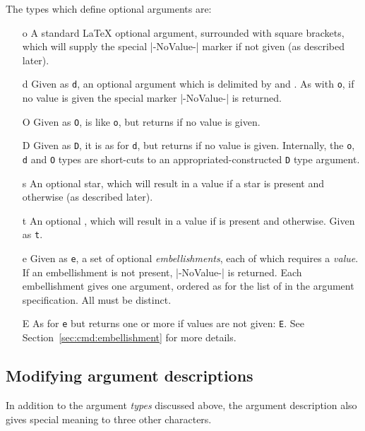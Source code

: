 \documentclass{l3doc}
\begin{document}
The types which define optional arguments are:
\begin{itemize}[font=\ttfamily]
  \item[o] A standard \LaTeX{} optional argument, surrounded with square
    brackets, which will supply the special |-NoValue-| marker if not given
    (as described later).
  \item[d] Given as \texttt{d}, an optional
    argument which is delimited by  and . As with
    \texttt{o}, if no value is given the special marker |-NoValue-| is
    returned.
  \item[O] Given as \texttt{O}, is like \texttt{o}, but returns
     if no value is given.
  \item[D] Given as \texttt{D}, it is
    as for \texttt{d}, but returns  if no value is given.
    Internally, the \texttt{o}, \texttt{d} and \texttt{O} types are
    short-cuts to an appropriated-constructed \texttt{D} type argument.
  \item[s] An optional star, which will result in a value
     if a star is present and 
    otherwise (as described later).
  \item[t] An optional , which will result in a value
     if  is present and 
    otherwise. Given as \texttt{t}.
  \item[e] Given as \texttt{e}, a set of optional
    \emph{embellishments}, each of which requires a \emph{value}.
    If an embellishment is not present, |-NoValue-| is returned.  Each
    embellishment gives one argument, ordered as for the list of
     in the argument specification.  All 
    must be distinct.
  \item[E] As for \texttt{e} but returns one or more 
    if values are not given: \texttt{E}. See
    Section~\ref{sec:cmd:embellishment} for more details.
\end{itemize}

\subsection{Modifying argument descriptions}

In addition to the argument \emph{types} discussed above, the argument
description also gives special meaning to three other characters.
\end{document}
